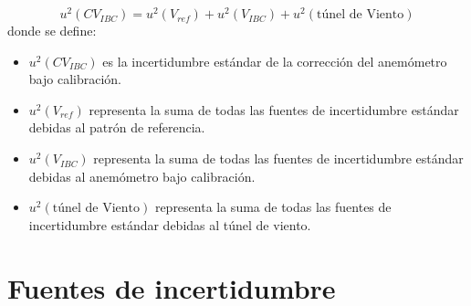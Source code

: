 \begin{equation}
    u^{2}(CV_{IBC}) = u^{2}(V_{ref})+u^{2}(V_{IBC})+u^{2}(\text{túnel de Viento})
    \label{eq:incertidumbreCombinada}
\end{equation}
donde se define:

\begin{itemize}
    \item $u^{2}(CV_{IBC})$ es la incertidumbre estándar de la corrección del anemómetro bajo calibración.
    \item $u^{2}(V_{ref})$ representa la suma de todas las fuentes de incertidumbre estándar debidas al patrón de referencia.
    \item $u^{2}(V_{IBC})$ representa la suma de todas las fuentes de incertidumbre estándar debidas al anemómetro bajo calibración.
    \item $u^{2}(\text{túnel de Viento})$ representa la suma de todas las fuentes de incertidumbre estándar debidas al túnel de viento.
\end{itemize}
\newpage
\section{Fuentes de incertidumbre}\label{sec:fuentesDeIncertidumbre}
\newcommand{\descCalibracion}{Incertidumbre expandida especificada  en el certificado de calibración.}
\newcommand{\descAjusteCalibracion}{Desvío estándar del ajuste lineal con los datos discretos del certificado de calibración.}
\newcommand{\descResolucionInstrumento}{Mínima diferencia entre valores indicados por el instrumento bajo calibración a través de su sistema de adquisición o lectura de datos.}
\newcommand{\descResolucionPatron}{Solo se debe agregar en caso de utilizar un sistema de lectura o adquisición distinto al que fue calibrado.}
\newcommand{\descRepetibilidad}{Desvío estándar de la media aritmética de las mediciones.}
\newcommand{\descHisteresis}{Diferencia entre los valores de mediciones realizadas en los ciclos ascendente y descendente.}
\newcommand{\descFactorBloqueo}{Incertidumbre asociada al factor de bloqueo que se define como la relación entre el área transversal del túnel de viento y el área efectiva del anemómetro, proyectada en el plano transversal.}
\newcommand{\descHomogeneidad}{Variación espacial del flujo de aire dentro del túnel.}
\newcommand{\descAjusteHomogeneidad}{Desvío estándar del ajuste lineal con los datos discretos del certificado de homogeneidad.}
\newcommand{\descEstabilidad}{Variación temporal del flujo de aire dentro del túnel.}
\newcommand{\descAjusteEstabilidad}{Desvío estándar del ajuste lineal con los datos discretos del certificado de estabilidad.}
\newcommand{\descFactorCalib}{Incertidumbre asociada al factor de calibracion que proporciona la relación entre las condiciones en la posición de medición de referencia y las condiciones en la posición del IBC.}

